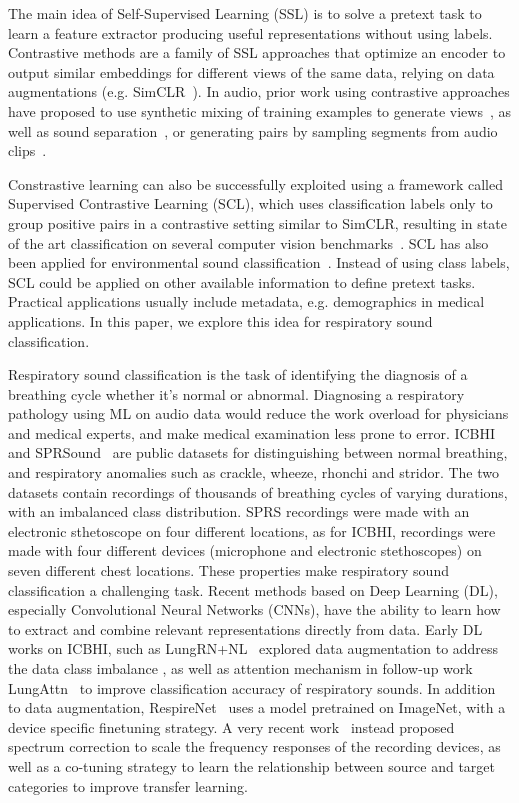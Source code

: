 \documentclass{article}
\begin{document}
\begin{sloppy}
The main idea of Self-Supervised Learning (SSL) is to solve a pretext task to learn a feature extractor producing useful representations without using labels. Contrastive methods are a family of SSL approaches that optimize an encoder to output similar embeddings for different views of the same data, relying on data augmentations (e.g. SimCLR~\cite{chen2020simple}). 
In audio, prior work using contrastive approaches have proposed to use synthetic mixing of training examples to generate views~\cite{fonseca2021unsupervised}, as well as sound separation~\cite{fonseca2021self}, or generating pairs by sampling segments from audio clips~\cite{cola}. 

Constrastive learning can also be successfully exploited using a framework called Supervised Contrastive Learning (SCL), which uses classification labels only to group positive pairs in a contrastive setting similar to SimCLR, resulting in state of the art classification on several computer vision benchmarks~\cite{khosla2020supervised}. SCL has also been applied for environmental sound classification~\cite{soundclr}. Instead of using class labels, SCL could be applied on other available information to define pretext tasks. Practical applications usually include metadata, e.g. demographics in medical applications. In this paper, we explore this idea for respiratory sound classification.

Respiratory sound classification is the task of identifying the diagnosis of a breathing cycle whether it's normal or abnormal. Diagnosing a respiratory pathology using ML on audio data would reduce the work overload for physicians and medical experts, and make medical examination less prone to error. ICBHI~\cite{rocha2019open} and SPRSound~\cite{SPRSound} are public datasets for distinguishing between normal breathing, and respiratory anomalies such as crackle, wheeze, rhonchi and stridor. The two datasets contain recordings of thousands of breathing cycles of varying durations, with an imbalanced class distribution. SPRS recordings were made with an electronic sthetoscope on four different locations, as for ICBHI, recordings were made with four different devices (microphone and electronic stethoscopes) on seven different chest locations. These properties make respiratory sound classification a challenging task. Recent methods based on Deep Learning (DL), especially Convolutional Neural Networks (CNNs), have the ability to learn how to extract and combine relevant representations directly from data. Early DL works on ICBHI, such as LungRN+NL~\cite{lungrn+nl} explored data augmentation to address the data class imbalance , as well as attention mechanism in follow-up work LungAttn~\cite{Li_2021} to improve classification accuracy of respiratory sounds.
In addition to data augmentation, RespireNet~\cite{gairola2020respirenet} uses a model pretrained on ImageNet, with a device specific finetuning strategy. A very recent work~\cite{9729496} instead proposed spectrum correction to scale the frequency responses of the recording devices, as well as a co-tuning strategy to learn the relationship between source and target categories to improve transfer learning. 


\end{sloppy}
\end{document}
